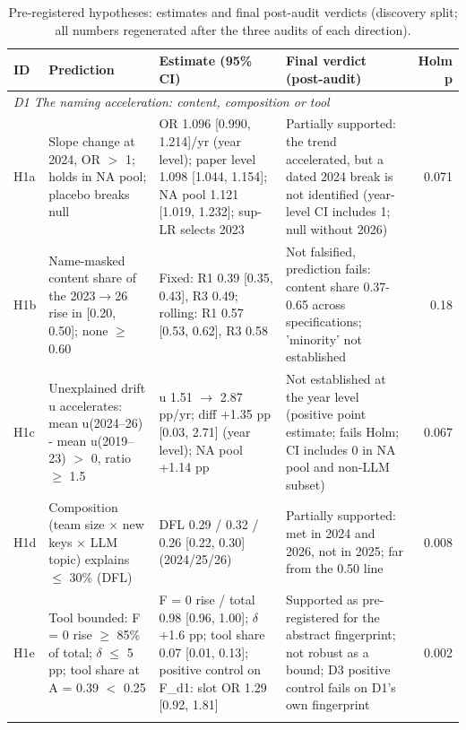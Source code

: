 \begin{table}[t]
\centering
\scriptsize
\caption{Pre-registered hypotheses: estimates and final post-audit verdicts (discovery split; all numbers regenerated after the three audits of each direction).}
\label{tab:hypotheses}
\begin{tabular}{l p{3.4cm} p{5.0cm} p{3.6cm} r}
\toprule
ID & Prediction & Estimate (95\% CI) & Final verdict (post-audit) & Holm p \\
\midrule
\multicolumn{5}{l}{\textit{D1 The naming acceleration: content, composition or tool}} \\
H1a & Slope change at 2024, OR $>$ 1; holds in NA pool; placebo breaks null & OR 1.096 [0.990, 1.214]/yr (year level); paper level 1.098 [1.044, 1.154]; NA pool 1.121 [1.019, 1.232]; sup-LR selects 2023 & Partially supported: the trend accelerated, but a dated 2024 break is not identified (year-level CI includes 1; null without 2026) & 0.071 \\
H1b & Name-masked content share of the 2023$\rightarrow$26 rise in [0.20, 0.50]; none $\geq$ 0.60 & Fixed: R1 0.39 [0.35, 0.43], R3 0.49; rolling: R1 0.57 [0.53, 0.62], R3 0.58 & Not falsified, prediction fails: content share 0.37-0.65 across specifications; 'minority' not established & 0.18 \\
H1c & Unexplained drift u accelerates: mean u(2024--26) - mean u(2019--23) $>$ 0, ratio $\geq$ 1.5 & u 1.51 $\rightarrow$ 2.87 pp/yr; diff +1.35 pp [0.03, 2.71] (year level); NA pool +1.14 pp & Not established at the year level (positive point estimate; fails Holm; CI includes 0 in NA pool and non-LLM subset) & 0.067 \\
H1d & Composition (team size $\times$ new keys $\times$ LLM topic) explains $\leq$ 30\% (DFL) & DFL 0.29 / 0.32 / 0.26 [0.22, 0.30] (2024/25/26) & Partially supported: met in 2024 and 2026, not in 2025; far from the 0.50 line & 0.008 \\
H1e & Tool bounded: F = 0 rise $\geq$ 85\% of total; $\delta$ $\leq$ 5 pp; tool share at A = 0.39 $<$ 0.25 & F = 0 rise / total 0.98 [0.96, 1.00]; $\delta$ +1.6 pp; tool share 0.07 [0.01, 0.13]; positive control on F\_d1: slot OR 1.29 [0.92, 1.81] & Supported as pre-registered for the abstract fingerprint; not robust as a bound; D3 positive control fails on D1's own fingerprint & 0.002 \\
\addlinespace
\multicolumn{5}{l}{\textit{D2 Who carries the change (declared profile keys)}} \\

\end{tabular}
\end{table}
